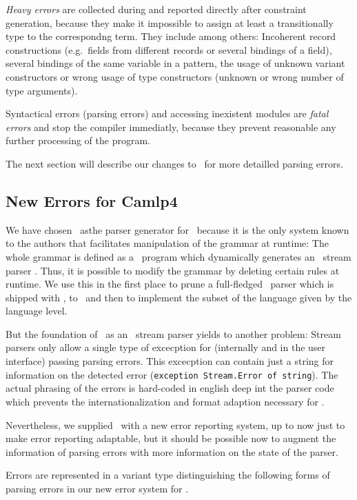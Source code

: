 \emph{Heavy errors} are collected during and reported directly after constraint
generation, because they make it impossible to assign at least a transitionally
type to the correspondng term. They include among others:
Incoherent record constructions (e.g.\ fields from different records or several
bindings of a field), several bindings of the same variable in a pattern, the usage of
unknown variant constructors or wrong usage of type constructors (unknown or
wrong number of type arguments).

Syntactical errors (parsing errors) and accessing inexistent modules are
\emph{fatal errors} and stop the compiler immediatly, because they prevent
reasonable any further processing of the program.

The next section will describe our changes to \camlpf\ for more detailled
parsing errors.

\subsection{New Errors for Camlp4}

We have chosen \camlpf\ asthe parser generator for \easyocaml\ because it is
the only system known to the authors that facilitates manipulation of the
grammar at runtime: The whole grammar is defined as a \ocaml\ program which
dynamically generates an \ocaml\ stream parser \cite{ocamlstreamparser}. Thus,
it is possible to modify the grammar by deleting certain rules at runtime. We
use this in the first place to prune a full-fledged \ocaml\ parser which is
shipped with \camlpf, to \camlm\ and then to implement the subset of the
language given by the language level.

But the foundation of \camlpf\ as an \ocaml\ stream parser yields to another
problem: Stream parsers only allow a single type of excecption for (internally
and in the user interface) passing parsing errors. This excecption can contain
just a string for information on the detected error (\texttt{exception
Stream.Error of string}). The actual phrasing of the errors is hard-coded in
english deep int the parser code which prevents the internationalization and
format adaption necessary for \easyocaml.


Nevertheless, we supplied \camlpf\ with a new error reporting system, up 
to now just to make error reporting adaptable, but it should be possible 
now to augment the information of parsing errors with more information on the
state of the parser.

Errors are represented in a variant type distinguishing the following forms of
parsing errors in our new error system for \camlpf.

